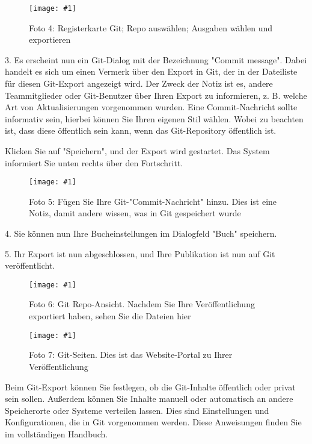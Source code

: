\documentclass{article}
\newlength{\imgwidth}
\newcommand\scaledgraphics[2]{%
                
\settowidth{\imgwidth}{\texttt{[image: \#1]}}%
                
\setlength{\imgwidth}{\minof{\imgwidth}{#2\textwidth}}%
                
\texttt{[image: \#1]}%
                
}
\begin{document}
\begin{figure}
\scaledgraphics{e8845c51-1622-4ec7-aa72-ee8b7e6abe4f.png}{1}
\caption*{Foto 4: Registerkarte Git; Repo auswählen; Ausgaben wählen und exportieren}\label{F38533511}
\end{figure}


3. Es erscheint nun ein Git-Dialog mit der Bezeichnung "Commit message". Dabei handelt es sich um einen Vermerk über den Export in Git, der in der Dateiliste für diesen Git-Export angezeigt wird. Der Zweck der Notiz ist es, andere Teammitglieder oder Git-Benutzer über Ihren Export zu informieren, z. B. welche Art von Aktualisierungen vorgenommen wurden. Eine Commit-Nachricht sollte informativ sein, hierbei können Sie Ihren eigenen Stil wählen. Wobei zu beachten ist, dass diese öffentlich sein kann, wenn das Git-Repository öffentlich ist.


Klicken Sie auf "Speichern", und der Export wird gestartet. Das System informiert Sie unten rechts über den Fortschritt.

\begin{figure}
\scaledgraphics{7d590885-49d2-47f1-8431-ab0deae1809e.png}{1}
\caption*{Foto 5: Fügen Sie Ihre Git-"Commit-Nachricht" hinzu. Dies ist eine Notiz, damit andere wissen, was in Git gespeichert wurde}\label{F33749451}
\end{figure}


4. Sie können nun Ihre Bucheinstellungen im Dialogfeld "Buch" speichern.


5. Ihr Export ist nun abgeschlossen, und Ihre Publikation ist nun auf Git veröffentlicht.

\begin{figure}
\scaledgraphics{d80dc5a5-d385-4a3b-a03a-a752ff2686c9.png}{1}
\caption*{Foto 6: Git Repo-Ansicht. Nachdem Sie Ihre Veröffentlichung exportiert haben, sehen Sie die Dateien hier}\label{F3226031}
\end{figure}

\begin{figure}
\scaledgraphics{0aea86b5-871e-4b80-95ca-5b030854029d.png}{1}
\caption*{Foto 7: Git-Seiten. Dies ist das Website-Portal zu Ihrer Veröffentlichung}\label{F13437801}
\end{figure}


Beim Git-Export können Sie festlegen, ob die Git-Inhalte öffentlich oder privat sein sollen. Außerdem können Sie Inhalte manuell oder automatisch an andere Speicherorte oder Systeme verteilen lassen. Dies sind Einstellungen und Konfigurationen, die in Git vorgenommen werden. Diese Anweisungen finden Sie im vollständigen Handbuch.
\end{document}
